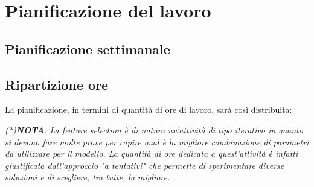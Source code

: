 
\section*{Pianificazione del lavoro}

\subsection*{Pianificazione settimanale}
\prospettoSettimanale

\newpage

\subsection*{Ripartizione ore}

La pianificazione, in termini di quantità di ore di lavoro, sarà così distribuita:

\begin{center}
    
\end{center}

\textit{(*)\textbf{NOTA}: La feature selection è di natura un'attività di tipo iterativo in quanto si devono fare molte prove per capire qual è la migliore combinazione di parametri da utilizzare 
per il modello. La quantità di ore dedicata a quest'attività è infatti giustificata dall'approccio "a tentativi" che permette di sperimentare diverse soluzioni e di scegliere, tra tutte, la migliore.}

\newpage